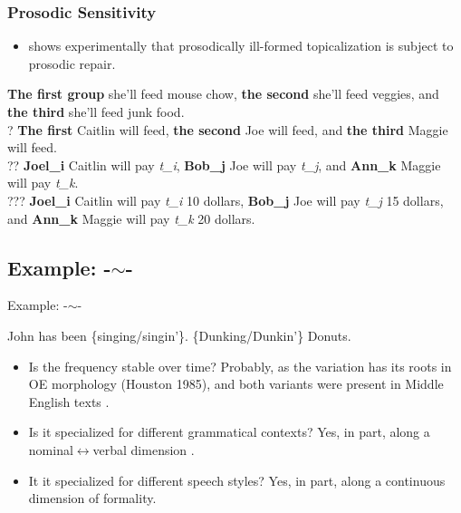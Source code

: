\documentclass[hyperref={pdfpagelabels=false}]{beamer}
\begin{document}
\begin{frame}
\frametitle{Prosodic Sensitivity}
\begin{itemize}
\item \citet{speyer2008, speyer2010} shows experimentally that prosodically ill-formed topicalization is subject to prosodic repair.
\end{itemize}
	\begin{exe}

	\ex  \textbf{The first group} she'll feed mouse chow, \textbf{the second} she'll feed veggies, and \textbf{the third} she'll feed  junk food.\\

	\ex  ? \textbf{The first} Caitlin will feed, \textbf{the second} Joe will feed, and \textbf{the third} Maggie will feed. \\

	\ex  ?? \textbf{Joel_i} Caitlin will pay \textsl{t_i}, \textbf{Bob_j} Joe will pay \textsl{t_j}, and \textbf{Ann_k} Maggie will pay \textsl{t_k}. \\
	
	\ex  ??? \textbf{Joel_i} Caitlin will pay \textsl{t_i} 10 dollars, \textbf{Bob_j} Joe will pay \textsl{t_j} 15 dollars, and \textbf{Ann_k} Maggie will pay \textsl{t_k} 20 dollars. \\

	\end{exe}
	
\end{frame}

\subsection{Example: -$\sim$-}
\begin{frame}{Example: -$\sim$-}
	\begin{exe}
			\ex John has been \{singing/singin'\}.
			\ex \{Dunking/Dunkin'\} Donuts.
	\end{exe}
	\begin{itemize}
		\item Is the frequency stable over time? Probably, as the variation has its roots in OE morphology (Houston 1985), and both variants were present in Middle English texts \citep{labov1989}.
		\item Is it specialized for different grammatical contexts? Yes, in part, along a nominal$\leftrightarrow$verbal dimension \citep{labov1989}.
		\item It it specialized for different speech styles? Yes, in part, along a continuous dimension of formality.
	\end{itemize}


\end{frame}
\end{document}
